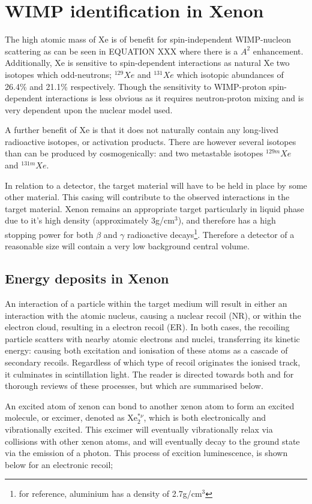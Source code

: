 \section{WIMP identification in Xenon}
\label{sec:wimps_with_xenon}

\par
The high atomic mass of Xe is of benefit for spin-independent WIMP-nucleon scattering as can be seen in EQUATION XXX where there is a $A^2$ enhancement.
Additionally, Xe is sensitive to spin-dependent interactions as natural Xe two isotopes which odd-neutrons; ${}^{129}Xe$ and ${}^{131}Xe$ which isotopic abundances of 26.4\% and 21.1\% respectively.
Though the sensitivity to WIMP-proton spin-dependent interactions is less obvious as it requires neutron-proton mixing and is very dependent upon the nuclear model used.

\par
A further benefit of Xe is that it does not naturally contain any long-lived radioactive isotopes, or activation products.
There are however several isotopes than can be produced by cosmogenically: and two metastable isotopes ${}^{129m}Xe$ and ${}^{131m}Xe$.


\par
In relation to a detector, the target material will have to be held in place by some other material.
This casing will contribute to the observed interactions in the target material.
Xenon remains an appropriate target particularly in liquid phase due to it's high density (approximately 3g/cm${}^{3}$), and therefore has a high stopping power for both $\beta$ and $\gamma$ radioactive decays\footnote{for reference, aluminium has a density of 2.7g/cm${}^{3}$}.
Therefore a detector of a reasonable size will contain a very low background central volume.


\subsection{Energy deposits in Xenon}
\par
An interaction of a particle within the target medium will result in either an interaction with the atomic nucleus, causing a nuclear recoil (NR), or within the electron cloud, resulting in a electron recoil (ER).
In both cases, the recoiling particle scatters with nearby atomic electrons and nuclei, transferring its kinetic energy: causing both excitation and ionisation of these atoms as a cascade of secondary recoils.
Regardless of which type of recoil originates the ionised track, it culminates in scintillation light.
The reader is directed towards both \cite{xenon_physics_ref} and \cite{carldahl_thesis_ref} for thorough reviews of these processes, but which are summarised below.
\par
An excited atom of xenon can bond to another xenon atom to form an excited molecule, or excimer, denoted as Xe$_2^{*\nu}$, which is both electronically and vibrationally excited.
This excimer will eventually vibrationally relax via collisions with other xenon atoms, and will eventually decay to the ground state via the emission of a photon.
This process of excition luminescence, is shown below for an electronic recoil;

